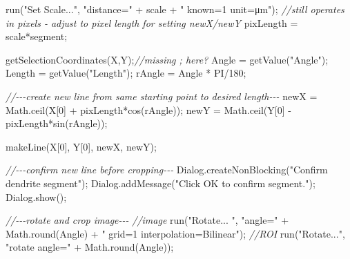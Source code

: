 \documentclass[
  12pt,
  a4paper,
]{book}
\newenvironment{Shaded}{}{}
\newcommand{\CommentTok}[1]{\textcolor[rgb]{0.38,0.63,0.69}{\textit{#1}}}
\newcommand{\DecValTok}[1]{\textcolor[rgb]{0.25,0.63,0.44}{#1}}
\newcommand{\NormalTok}[1]{#1}
\newcommand{\OperatorTok}[1]{\textcolor[rgb]{0.40,0.40,0.40}{#1}}
\newcommand{\StringTok}[1]{\textcolor[rgb]{0.25,0.44,0.63}{#1}}
\begin{document}
\begin{Shaded}
\begin{Highlighting}[]
\NormalTok{    run}\OperatorTok{(}\StringTok{"Set Scale..."}\OperatorTok{,} \StringTok{"distance="} \OperatorTok{+}\NormalTok{ scale }\OperatorTok{+} \StringTok{" known=1 unit=μm"}\OperatorTok{);}
    \CommentTok{//still operates in pixels {-} adjust to pixel length for setting newX/newY}
\NormalTok{    pixLength }\OperatorTok{=}\NormalTok{ scale}\OperatorTok{*}\NormalTok{segment}\OperatorTok{;}
    
\NormalTok{    getSelectionCoordinates}\OperatorTok{(}\NormalTok{X}\OperatorTok{,}\NormalTok{Y}\OperatorTok{);}\CommentTok{//missing ; here?}
\NormalTok{    Angle }\OperatorTok{=}\NormalTok{ getValue}\OperatorTok{(}\StringTok{"Angle"}\OperatorTok{);}
\NormalTok{    Length }\OperatorTok{=}\NormalTok{ getValue}\OperatorTok{(}\StringTok{"Length"}\OperatorTok{);}
\NormalTok{    rAngle }\OperatorTok{=}\NormalTok{ Angle }\OperatorTok{*}\NormalTok{ PI}\OperatorTok{/}\DecValTok{180}\OperatorTok{;}
        
    \CommentTok{//{-}{-}{-}create new line from same starting point to desired length{-}{-}{-}}
\NormalTok{    newX }\OperatorTok{=}\NormalTok{ Math}\OperatorTok{.}\NormalTok{ceil}\OperatorTok{(}\NormalTok{X}\OperatorTok{[}\DecValTok{0}\OperatorTok{]} \OperatorTok{+}\NormalTok{ pixLength}\OperatorTok{*}\NormalTok{cos}\OperatorTok{(}\NormalTok{rAngle}\OperatorTok{));}
\NormalTok{    newY }\OperatorTok{=}\NormalTok{ Math}\OperatorTok{.}\NormalTok{ceil}\OperatorTok{(}\NormalTok{Y}\OperatorTok{[}\DecValTok{0}\OperatorTok{]} \OperatorTok{{-}}\NormalTok{ pixLength}\OperatorTok{*}\NormalTok{sin}\OperatorTok{(}\NormalTok{rAngle}\OperatorTok{));}
    
\NormalTok{    makeLine}\OperatorTok{(}\NormalTok{X}\OperatorTok{[}\DecValTok{0}\OperatorTok{],}\NormalTok{ Y}\OperatorTok{[}\DecValTok{0}\OperatorTok{],}\NormalTok{ newX}\OperatorTok{,}\NormalTok{ newY}\OperatorTok{);}
        
    \CommentTok{//{-}{-}{-}confirm new line before cropping{-}{-}{-}}
\NormalTok{    Dialog}\OperatorTok{.}\NormalTok{createNonBlocking}\OperatorTok{(}\StringTok{"Confirm dendrite segment"}\OperatorTok{);}
\NormalTok{    Dialog}\OperatorTok{.}\NormalTok{addMessage}\OperatorTok{(}\StringTok{"Click \textquotesingle{}OK\textquotesingle{} to confirm segment."}\OperatorTok{);}
\NormalTok{    Dialog}\OperatorTok{.}\NormalTok{show}\OperatorTok{();}
        
    \CommentTok{//{-}{-}{-}rotate and crop image{-}{-}{-}}
    \CommentTok{//image}
\NormalTok{    run}\OperatorTok{(}\StringTok{"Rotate... "}\OperatorTok{,} \StringTok{"angle="} \OperatorTok{+}\NormalTok{ Math}\OperatorTok{.}\NormalTok{round}\OperatorTok{(}\NormalTok{Angle}\OperatorTok{)} \OperatorTok{+} \StringTok{" grid=1 interpolation=Bilinear"}\OperatorTok{);}
    \CommentTok{//ROI}
\NormalTok{    run}\OperatorTok{(}\StringTok{"Rotate..."}\OperatorTok{,} \StringTok{"rotate angle="} \OperatorTok{+}\NormalTok{ Math}\OperatorTok{.}\NormalTok{round}\OperatorTok{(}\NormalTok{Angle}\OperatorTok{));}
    

\end{Highlighting}
\end{Shaded}
\end{document}
